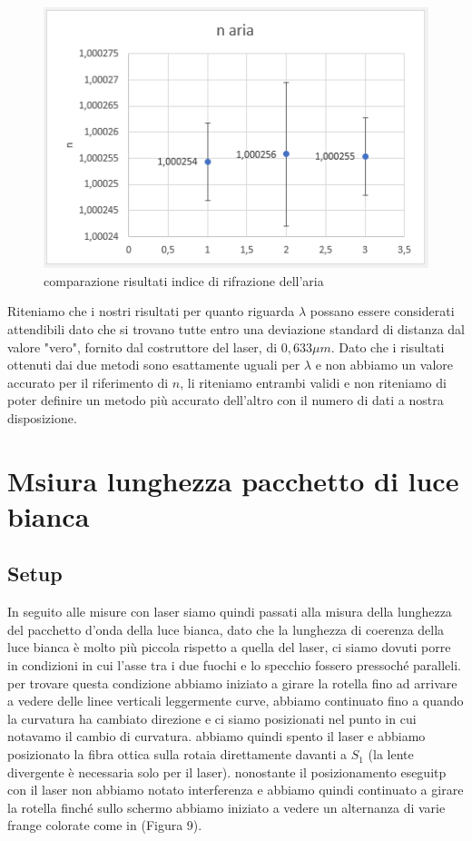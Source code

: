 \documentclass{article}
\begin{document}
\begin{figure}[h!]
  \centering
  \includegraphics[width=0.6\linewidth]{IM grafico risultati n}
  \caption{comparazione risultati indice di rifrazione dell'aria}
\end{figure}


Riteniamo che i nostri risultati per quanto riguarda $\lambda$ possano essere considerati attendibili dato che si trovano tutte entro una deviazione standard di distanza dal valore "vero", fornito dal costruttore del laser, di $0,633 \mu m$. Dato che i risultati ottenuti dai due metodi sono esattamente uguali per $\lambda$ e non abbiamo un valore accurato per il riferimento di $n$, li riteniamo entrambi validi e non riteniamo di poter definire un metodo più accurato dell'altro con il numero di dati a nostra disposizione. 




\section{Msiura lunghezza pacchetto di luce bianca}

\subsection{Setup}
In seguito alle misure con laser siamo quindi passati alla misura della lunghezza del pacchetto d'onda della luce bianca, dato che la lunghezza di coerenza della luce bianca è molto più piccola rispetto a quella del laser, ci siamo dovuti porre in condizioni in cui l'asse tra i due fuochi e lo specchio fossero pressoché paralleli. per trovare questa condizione abbiamo iniziato a girare la rotella fino ad arrivare a vedere delle linee verticali leggermente curve, abbiamo continuato fino a quando la curvatura ha cambiato direzione e ci siamo posizionati nel punto in cui notavamo il cambio di curvatura. abbiamo quindi spento il laser e abbiamo posizionato la fibra ottica sulla rotaia direttamente davanti a $S_1$ (la lente divergente è necessaria solo per il laser). nonostante il posizionamento eseguitp con il laser non abbiamo notato interferenza e abbiamo quindi continuato a girare la rotella finché sullo schermo abbiamo iniziato a vedere un alternanza di varie frange colorate come in (Figura 9).
\end{document}
